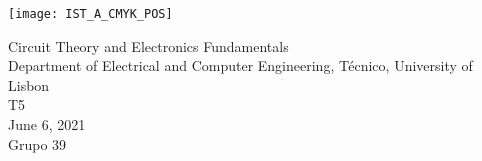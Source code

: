 
\thispagestyle {empty}

\texttt{[image: IST\_A\_CMYK\_POS]}

\begin{center}
    \vspace{1.0cm}

    \vspace{1cm}
    {\FontLb Circuit Theory and Electronics Fundamentals} \\ %
    \vspace{1cm}
    {\FontSn Department of Electrical and Computer Engineering, Técnico, University of Lisbon} \\ %
    \vspace{1cm}
    {\FontSn T5} \\
    \vspace{1cm}
    {\FontSn June 6, 2021} \\
    {\FontSn Grupo 39}
\end{center}


